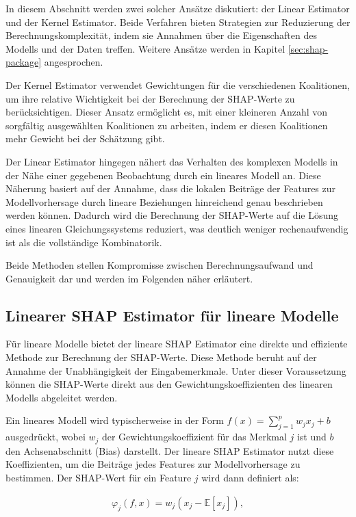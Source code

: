 In diesem Abschnitt werden zwei solcher Ansätze diskutiert: der Linear Estimator und der Kernel Estimator. 
Beide Verfahren bieten Strategien zur Reduzierung der Berechnungskomplexität, 
indem sie Annahmen über die Eigenschaften des Modells und der Daten treffen. 
Weitere Ansätze werden in Kapitel \ref{sec:shap-package} angesprochen.

Der Kernel Estimator verwendet Gewichtungen für die verschiedenen Koalitionen, 
um ihre relative Wichtigkeit bei der Berechnung der SHAP-Werte zu berücksichtigen. 
Dieser Ansatz ermöglicht es, mit einer kleineren Anzahl von sorgfältig ausgewählten 
Koalitionen zu arbeiten, indem er diesen Koalitionen mehr Gewicht bei der Schätzung gibt.

Der Linear Estimator hingegen nähert das Verhalten des komplexen Modells in der 
Nähe einer gegebenen Beobachtung durch ein lineares Modell an. Diese Näherung basiert auf der Annahme, 
dass die lokalen Beiträge der Features zur Modellvorhersage durch lineare Beziehungen hinreichend genau 
beschrieben werden können. Dadurch wird die Berechnung der SHAP-Werte auf die Lösung eines linearen 
Gleichungssystems reduziert, was deutlich weniger rechenaufwendig ist als die vollständige Kombinatorik.

Beide Methoden stellen Kompromisse zwischen Berechnungsaufwand und Genauigkeit dar und werden 
im Folgenden näher erläutert.

\subsection{Linearer SHAP Estimator für lineare Modelle}
\label{subsec:linear-shap-estimator}

Für lineare Modelle bietet der lineare SHAP Estimator eine direkte und effiziente 
Methode zur Berechnung der SHAP-Werte. Diese Methode beruht auf der Annahme 
der Unabhängigkeit der Eingabemerkmale. Unter dieser Voraussetzung können 
die SHAP-Werte direkt aus den Gewichtungskoeffizienten des linearen Modells 
abgeleitet werden.

Ein lineares Modell wird typischerweise in der Form 
\( f(x) = \sum_{j=1}^{p} w_j x_j + b \) ausgedrückt, wobei \( w_j \) der 
Gewichtungskoeffizient für das Merkmal \( j \) ist und \( b \) den 
Achsenabschnitt (Bias) darstellt. Der lineare SHAP Estimator nutzt 
diese Koeffizienten, um die Beiträge jedes Features zur Modellvorhersage 
zu bestimmen. Der SHAP-Wert für ein Feature \( j \) wird dann definiert als:

\begin{align}
    \varphi_j(f, x) = w_j (x_j - \mathbb{E}[x_j]),
\end{align}

